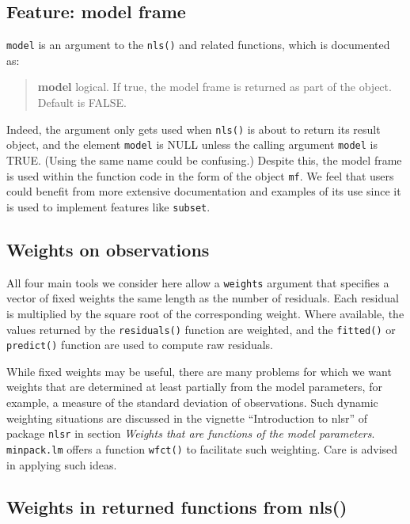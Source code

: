 \hypertarget{feature-model-frame}{%
\subsection{Feature: model frame}\label{feature-model-frame}}

\texttt{model} is an argument to the \texttt{nls()} and related functions, which is documented as:

\begin{quote}
\textbf{model} logical. If true, the model frame is returned as part of the object. Default is FALSE.
\end{quote}

Indeed, the argument only gets used when \texttt{nls()} is about to return its result
object, and the
element \texttt{model} is NULL unless the calling argument \texttt{model} is TRUE. (Using the same
name could
be confusing.) Despite this, the model frame is used within the function code in
the form of the object
\texttt{mf}. We feel that users could benefit from more extensive documentation and
examples of its use since it is used to implement features like \texttt{subset}.

\hypertarget{weights-on-observations}{%
\subsection{Weights on observations}\label{weights-on-observations}}

All four main tools we consider here allow a \texttt{weights} argument that
specifies a vector of fixed weights the same length as the number of residuals.
Each residual is multiplied by the square root of the corresponding weight.
Where available, the values returned by the
\texttt{residuals()} function are weighted, and the \texttt{fitted()} or \texttt{predict()} function are
used to compute raw residuals.

While fixed weights may be useful, there are many problems for which
we want weights that are determined at least partially from the model
parameters, for
example, a measure of the standard deviation of observations.
Such dynamic weighting situations are discussed in the vignette
``Introduction to nlsr'' of package \texttt{nlsr} in section
\emph{Weights that are functions of the model parameters}.
\texttt{minpack.lm} offers a function \texttt{wfct()} to
facilitate such weighting. Care is advised
in applying such ideas.

\hypertarget{weights-in-returned-functions-from-nls}{%
\subsection{Weights in returned functions from nls()}\label{weights-in-returned-functions-from-nls}}

